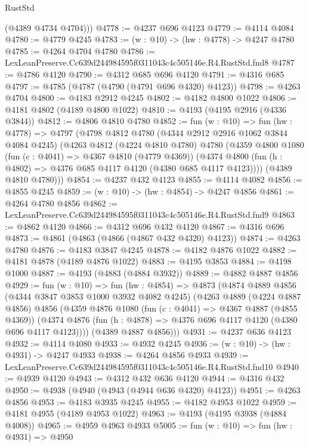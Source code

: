\begin{lexlean}{RustStd}
\begin{coremodule}
        (@4389 @4734 @4704)))
@4778 := @4237 @696 @4123
@4779 := @4114 @4084
@4780 := @4779 @4245
@4783 := (w : @10) -> (hw : @4778) -> @4247 @4780
@4785 := @4264 @4704 @4780
@4786 := LexLeanPreserve.Cc639d244984595f0311043c4c505146e.R4.RustStd.fnd8
@4787 := @4786 @4120
@4790 := @4312 @685 @696 @4120
@4791 := @4316 @685
@4797 := @4785 (@4787 (@4790 (@4791 @696 @4320) @4123))
@4798 := @4263 @4704
@4800 := @4183 @2912 @4245
@4802 := @4182 @4800 @1022
@4806 := @4181 @4802 (@4189 @4800 @1022)
@4810 := @4193 (@4195 @2916 (@4336 @3844))
@4812 := @4806 @4810 @4780
@4852 := fun (w : @10) =>
  fun (hw : @4778) =>
  @4797
    (@4798
      @4812
      @4780
      (@4344 @2912 @2916 @1062 @3844 @4084 @4245)
      (@4263
        @4812
        (@4224 @4810 @4780)
        @4780
        (@4359
          @4800
          @1080
          (fun (c : @4041) => @4367 @4810 (@4779 @4369))
          (@4374 @4800 (fun (h : @4802) => @4376 @685 @4117 @4120 (@4380 @685 @4117 @4123))))
        (@4389 @4810 @4780)))
@4854 := @4237 @432 @4123
@4855 := @4114 @4082
@4856 := @4855 @4245
@4859 := (w : @10) -> (hw : @4854) -> @4247 @4856
@4861 := @4264 @4780 @4856
@4862 := LexLeanPreserve.Cc639d244984595f0311043c4c505146e.R4.RustStd.fnd9
@4863 := @4862 @4120
@4866 := @4312 @696 @432 @4120
@4867 := @4316 @696
@4873 := @4861 (@4863 (@4866 (@4867 @432 @4320) @4123))
@4874 := @4263 @4780
@4876 := @4183 @3847 @4245
@4878 := @4182 @4876 @1022
@4882 := @4181 @4878 (@4189 @4876 @1022)
@4883 := @4195 @3853
@4884 := @4198 @1000
@4887 := @4193 (@4883 (@4884 @3932))
@4889 := @4882 @4887 @4856
@4929 := fun (w : @10) =>
  fun (hw : @4854) =>
  @4873
    (@4874
      @4889
      @4856
      (@4344 @3847 @3853 @1000 @3932 @4082 @4245)
      (@4263
        @4889
        (@4224 @4887 @4856)
        @4856
        (@4359
          @4876
          @1080
          (fun (c : @4041) => @4367 @4887 (@4855 @4369))
          (@4374 @4876 (fun (h : @4878) => @4376 @696 @4117 @4120 (@4380 @696 @4117 @4123))))
        (@4389 @4887 @4856)))
@4931 := @4237 @636 @4123
@4932 := @4114 @4080
@4933 := @4932 @4245
@4936 := (w : @10) -> (hw : @4931) -> @4247 @4933
@4938 := @4264 @4856 @4933
@4939 := LexLeanPreserve.Cc639d244984595f0311043c4c505146e.R4.RustStd.fnd10
@4940 := @4939 @4120
@4943 := @4312 @432 @636 @4120
@4944 := @4316 @432
@4950 := @4938 (@4940 (@4943 (@4944 @636 @4320) @4123))
@4951 := @4263 @4856
@4953 := @4183 @3935 @4245
@4955 := @4182 @4953 @1022
@4959 := @4181 @4955 (@4189 @4953 @1022)
@4963 := @4193 (@4195 @3938 (@4884 @4008))
@4965 := @4959 @4963 @4933
@5005 := fun (w : @10) =>
  fun (hw : @4931) =>
  @4950

\end{coremodule}
\end{lexlean}
